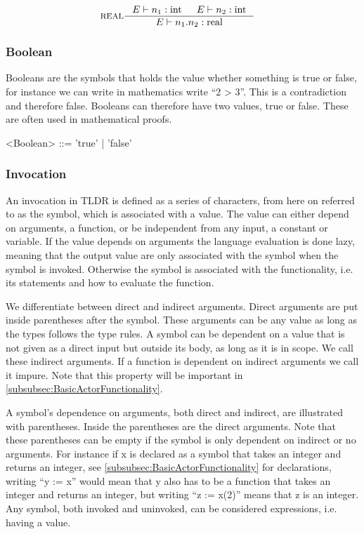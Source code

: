 \begin{align*}
&\inference[REAL]{\Tenv n_1:\Tint & \Tenv n_2:\Tint}
                 {\Tenv n_1.n_2: \Treal}
\end{align*}

\subsubsection{Boolean}
Booleans are the symbols that holds the value whether something is true or false, for instance we can write in mathematics write \enquote{2 > 3}. This is a contradiction and therefore false. Booleans can therefore have two values, true or false. These are often used in mathematical proofs.
\begin{grammar}
<Boolean> ::= 'true' | 'false'
\end{grammar}

\subsubsection{Invocation}
An invocation in TLDR is defined as a series of characters, from here on referred to as the symbol, which is associated with a value. The value can either depend on arguments, a function, or be independent from any input, a constant or variable. If the value depends on arguments the language evaluation is done lazy, meaning that the output value are only associated with the symbol when the symbol is invoked. Otherwise the symbol is associated with the functionality, i.e. its statements and how to evaluate the function. 

We differentiate between direct and indirect arguments. Direct arguments are put inside parentheses after the symbol. These arguments can be any value as long as the types follows the type rules. A symbol can be dependent on a value that is not given as a direct input but outside its body, as long as it is in scope. We call these indirect arguments. If a function is dependent on indirect arguments we call it impure. Note that this property will be important in \cref{subsubsec:BasicActorFunctionality}. 

A symbol's dependence on arguments, both direct and indirect, are illustrated with parentheses. Inside the parentheses are the direct arguments. Note that these parentheses can be empty if the symbol is only dependent on indirect or no arguments. For instance if x is declared as a symbol that takes an integer and returns an integer, see \cref{subsubsec:BasicActorFunctionality} for declarations, writing \enquote{y := x} would mean that y also has to be a function that takes an integer and returns an integer, but writing \enquote{z := x(2)} means that z is an integer. Any symbol, both invoked and uninvoked, can be considered expressions, i.e. having a value.

